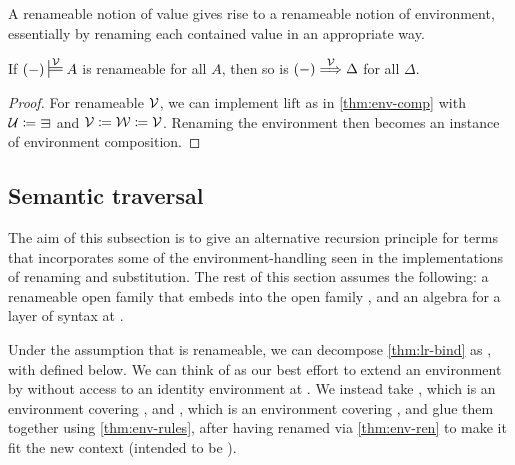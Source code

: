 
A renameable notion of value gives rise to a renameable notion of environment,
essentially by renaming each contained value in an appropriate way.

\begin{lemma}\label{thm:env-ren}
  If $\plr{-} \sdtstile{}\V A$ is renameable for all $A$, then so is
  $\plr{-} \env\V \Delta$ for all $\Delta$.
\end{lemma}
\begin{proof}
  For renameable $\V$, we can implement $\mathrm{lift}$ as in
  \cref{thm:env-comp} with $\U \coloneqq {\sqni}$ and
  $\mathcal V \coloneqq \mathcal W \coloneqq \mathcal V$.
  Renaming the environment then becomes an instance of environment composition.
\end{proof}

\subsection{Semantic traversal}\label{sec:traversal}

The aim of this subsection is to give an alternative recursion principle for
terms that incorporates some of the environment-handling seen in the
implementations of renaming and substitution.
The rest of this section assumes the following: a renameable open family
\AgdaBound{$\V$} that embeds into the open family \AgdaBound{$\C$}, and an
algebra for a layer of syntax at \AgdaBound{$\C$}.



Under the assumption that \AgdaBound{$\V$} is renameable, we can decompose
\cref{thm:lr-bind} as
\AgdaSpace{}\AgdaOperator{\AgdaFunction{$\circ$}}%
\AgdaSpace{}, with  defined below.
We can think of  as our best effort to extend an
environment by \AgdaBound{$\Theta$} without access to an identity environment
at \AgdaBound{$\Theta$}.
We instead take \AgdaBound{$\rho$}, which is an environment covering
\AgdaBound{$\Delta$}, and \AgdaBound{$\sigma$}, which is an environment
covering \AgdaBound{$\Theta$}, and glue them together using
\cref{thm:env-rules}, after having renamed \AgdaBound{$\rho$} via
\cref{thm:env-ren} to make it fit the new context \AgdaBound{$\Gamma^+$}
(intended to be ).

